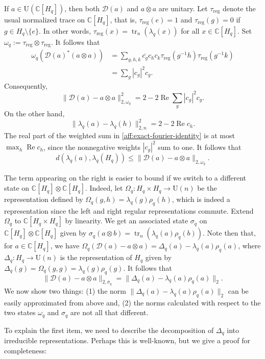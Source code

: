\documentclass[12pt]{amsart}
\numberwithin{equation}{section}
\theoremstyle{definition}
\def\bb{\mathbb}
\def\cal{\mathcal}
\DeclareMathOperator{\tr}{tr}
\def \reg{\operatorname{reg}}
\begin{document}
If $a\in \mathrm{U}(\bb C[H_q])$, then both
$\mathcal D(a)$ and $a\otimes a$ are unitary.  Let $\tau_{\reg}$ denote the usual normalized trace on $\bb C[H_q]$, that is, $\tau_{\reg}(e)=1$ and $\tau_{\reg}(g)=0$ if $g\in H_q\setminus \{e\}$.  In other words, $\tau_{\reg}(x)=\tr_n(\lambda_q(x))$ for all $x\in \bb C[H_q]$.  Set $\omega_q:=\tau_{\reg}\otimes \tau_{\reg}$.  It follows that
\begin{align*}
 \omega_q(\mathcal D(a)^*(a\otimes a))
 &=\sum_{g,h,k}\overline{c_g}c_hc_k
     \tau_{\mathrm{reg}}(g^{-1}h)\tau_{\mathrm{reg}}(g^{-1}k)\\
 &=\sum_g|c_g|^2c_g.
\end{align*}
Consequently,
\begin{equation}
\label{aff:exact-fourier-identity}
 \|\mathcal D(a)-a\otimes a\|_{2,\omega_q}^2
 =2-2\operatorname{Re}\sum_g|c_g|^2c_g.
\end{equation}
On the other hand,
\[
 \|\lambda_q(a)-\lambda_q(h)\|_{2,n}^2=2-2\operatorname{Re}c_h.
\]
The real part of the weighted sum in
\eqref{aff:exact-fourier-identity} is at most
$\max_h\operatorname{Re}c_h$, since the nonnegative weights
$|c_g|^2$ sum to one.  It follows that
\[
 d(\lambda_q(a),\lambda_q(H_q))
 \le\|\mathcal D(a)-a\otimes a\|_{2,\omega_q}.
\]

The term appearing on the right is easier to bound if we switch to a different state on $\bb C[H_q]\otimes \bb C[H_q]$.  Indeed, let $\Omega_q:H_q\times H_q\to \mathrm{U}(n)$ be the representation defined by $\Omega_q(g,h)=\lambda_q(g)\rho_q(h)$, which is indeed a representation since the left and right regular representations commute.  Extend $\Omega_q$ to $\bb C[H_q\times H_q]$ by linearity.  We get an associated state $\sigma_q$ on $\bb C[H_q]\otimes \bb C[H_q]$ given by $\sigma_q(a\otimes b)=\tr_{{n}}(\lambda_q(a)\rho_q(b))$.  Note then that, for $a\in \bb C[H_q]$, we have $\Omega_q(\cal D(a)-a\otimes a)=\Delta_q(a)-\lambda_q(a)\rho_q(a)$, where $\Delta_q:H_q\to \mathrm{U}(n)$ is the representation of $H_q$ given by $\Delta_q(g)=\Omega_q(g,g)=\lambda_q(g)\rho_q(g)$.  It follows that $$\|\cal D(a)-a\otimes a\|_{2,\sigma_q}=\|\Delta_q(a)-\lambda_q(a)\rho_q(a)\|_2.$$  We now show two things:  (1) the norm $\|\Delta_q(a)-\lambda_q(a)\rho_q(a)\|_2$ can be easily approximated from above and, (2) the norms calculated with respect to the two states $\omega_q$ and $\sigma_q$ are not all that different.

To explain the first item, we need to describe the decomposition of $\Delta_q$ into irreducible representations.  Perhaps this is well-known, but we give a proof for completeness:
\end{document}
